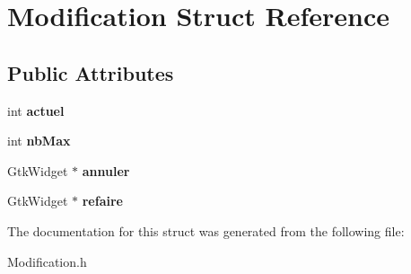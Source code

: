 \hypertarget{structModification}{
\section{Modification Struct Reference}
\label{structModification}
}
\subsection*{Public Attributes}
\begin{DoxyCompactItemize}
\item 
\hypertarget{structModification_acec3f2c5862188b05ee3ea92d8247185}{
int {\bfseries actuel}}
\label{structModification_acec3f2c5862188b05ee3ea92d8247185}

\item 
\hypertarget{structModification_a23ed422b07c982a54985a0b3f4b9814b}{
int {\bfseries nbMax}}
\label{structModification_a23ed422b07c982a54985a0b3f4b9814b}

\item 
\hypertarget{structModification_a886ecdba59aab05cbd646341969e7d80}{
GtkWidget $\ast$ {\bfseries annuler}}
\label{structModification_a886ecdba59aab05cbd646341969e7d80}

\item 
\hypertarget{structModification_abf8692dd2174f156ef031018f130ef36}{
GtkWidget $\ast$ {\bfseries refaire}}
\label{structModification_abf8692dd2174f156ef031018f130ef36}

\end{DoxyCompactItemize}


The documentation for this struct was generated from the following file:\begin{DoxyCompactItemize}
\item 
Modification.h\end{DoxyCompactItemize}
